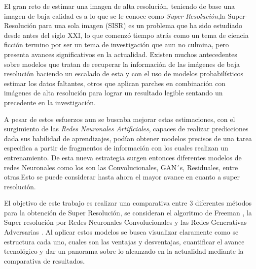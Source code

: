 
El gran reto de estimar una imagen de alta resolución, teniendo de base una imagen de baja calidad es a lo que se le conoce como 
\emph{Super Resolución},la Super-Resolución para una sola imagen (SISR) es un problema que ha sido estudiado desde antes del siglo XXI, lo que comenzó tiempo atrás
como un tema de ciencia ficción termino por ser un tema de investigación que aun no culmina, pero presenta avances significativos en la actualidad.
Existen muchos antecedentes sobre modelos que tratan de recuperar la información de las imágenes de baja resolución haciendo un escalado de esta y 
 con el uso de modelos probabilísticos estimar los datos faltantes, otros que aplican parches en combinación con imágenes de alta resolución para lograr un 
 resultado legible sentando un precedente en la investigación.
 
 A pesar de estos esfuerzos aun se buscaba mejorar estas estimaciones, con el surgimiento de las \emph{Redes Neuronales Artificiales}, capaces de realizar predicciones dada sus
habilidad de aprendizajes, podían obtener modelos precisos de una tarea especifica a partir de fragmentos de información con los cuales realizan un entrenamiento. De
esta nueva estrategia surgen entonces diferentes modelos de redes Neuronales como los son las Convolucionales, GAN´s, Residuales, entre otras.Esto 
se puede considerar hasta ahora el mayor avance en cuanto a super resolución.

El objetivo de este trabajo es realizar una comparativa entre 3 diferentes métodos para la obtención de Super Resolución, se consideran el algoritmo de Freeman \cite{freeman},
la Super resolución por Redes Neuronales Convolucionales \cite{SRCNN} y las Redes Generativas Adversarias \cite{SRGAN}. Al aplicar estos modelos se busca
visualizar claramente como se estructura cada uno, cuales son las ventajas y desventajas, cuantificar el avance tecnológico y dar un panorama sobre lo alcanzado en la actualidad
mediante la comparativa de resultados. 